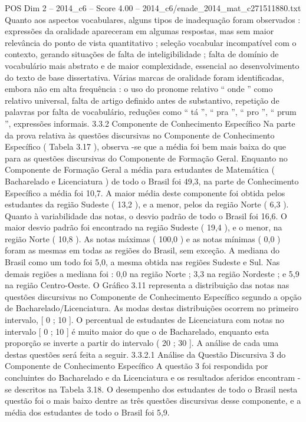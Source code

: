 \begin{textsample}{POS Dim 2 – 2014\_c6 – Score 4.00 – 2014\_c6/enade\_2014\_mat\_c271511880.txt}
Quanto aos aspectos vocabulares, alguns tipos de inadequação foram observados : expressões da oralidade apareceram em algumas respostas, mas sem maior relevância do ponto de vista quantitativo ; seleção vocabular incompatível com o contexto, gerando situações de falta de inteligibilidade ; falta de domínio de vocabulário mais abstrato e de maior complexidade, essencial ao desenvolvimento do texto de base dissertativa.
Várias marcas de oralidade foram identificadas, embora não em alta frequência : o uso do pronome relativo “ onde ” como relativo universal, falta de artigo definido antes de substantivo, repetição de palavras por falta de vocabulário, reduções como “ tá ”, “ pra ”, “ pro ”, “ prum ”, expressões informais. 3.3.2 Componente de Conhecimento Específico Na parte da prova relativa às questões discursivas no Componente de Conhecimento Específico ( Tabela 3.17 ), observa -se que a média foi bem mais baixa do que para as questões discursivas do Componente de Formação Geral.
Enquanto no Componente de Formação Geral a média para estudantes de Matemática ( Bacharelado e Licenciatura ) de todo o Brasil foi 49,3, na parte de Conhecimento Específico a média foi 10,7.
A maior média deste componente foi obtida pelos estudantes da região Sudeste ( 13,2 ), e a menor, pelos da região Norte ( 6,3 ).
Quanto à variabilidade das notas, o desvio padrão de todo o Brasil foi 16,6.
O maior desvio padrão foi encontrado na região Sudeste ( 19,4 ), e o menor, na região Norte ( 10,8 ).
As notas máximas ( 100,0 ) e as notas mínimas ( 0,0 ) foram as mesmas em todas as regiões do Brasil, sem exceção.
A mediana do Brasil como um todo foi 5,0, a mesma obtida nas regiões Sudeste e Sul.
Nas demais regiões a mediana foi : 0,0 na região Norte ; 3,3 na região Nordeste ; e 5,9 na região Centro-Oeste.
O Gráfico 3.11 representa a distribuição das notas nas questões discursivas no Componente de Conhecimento Específico segundo a opção de Bacharelado/Licenciatura.
As modas destas distribuições ocorrem no primeiro intervalo, [ 0 ; 10 ].
O percentual de estudantes de Licenciatura com notas no intervalo [ 0 ; 10 ] é muito maior do que o de Bacharelado, enquanto esta proporção se inverte a partir do intervalo ( 20 ; 30 ].
A análise de cada uma destas questões será feita a seguir. 3.3.2.1 Análise da Questão Discursiva 3 do Componente de Conhecimento Específico A questão 3 foi respondida por concluintes do Bacharelado e da Licenciatura e os resultados aferidos encontram -se descritos na Tabela 3.18.
O desempenho dos estudantes de todo o Brasil nesta questão foi o mais baixo dentre as três questões discursivas desse componente, e a média dos estudantes de todo o Brasil foi 5,9.

\end{textsample}
